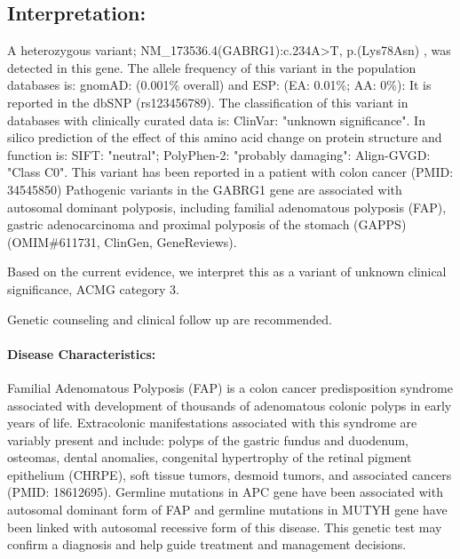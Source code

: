 \documentclass[9pt]{extarticle}
\begin{document}
\subsection*{Interpretation:}
\vspace{-1em}
A heterozygous variant; NM\_173536.4(GABRG1):c.234A>T, p.(Lys78Asn) , was detected in this gene. The allele frequency of this variant in the population databases is: gnomAD: (0.001\% overall) and ESP: (EA: 0.01\%; AA: 0\%): It is reported in the dbSNP (rs123456789). The classification of this variant in databases with clinically curated data is: ClinVar: "unknown significance". In silico prediction of the effect of this amino acid change on protein structure and function is: SIFT: "neutral"; PolyPhen-2: "probably damaging": Align-GVGD: "Class C0". This variant has been reported in a patient with colon cancer (PMID: 34545850) Pathogenic variants in the GABRG1 gene are associated with autosomal dominant polyposis, including familial adenomatous polyposis (FAP), gastric adenocarcinoma and proximal polyposis of the stomach (GAPPS) (OMIM\#611731, ClinGen, GeneReviews).

Based on the current evidence, we interpret this as a variant of unknown clinical significance, ACMG category 3.

Genetic counseling and clinical follow up are recommended.

\paragraph{Disease Characteristics:} Familial Adenomatous Polyposis (FAP) is a colon cancer predisposition syndrome associated with development of thousands of adenomatous colonic polyps in early years of life. Extracolonic manifestations associated with this syndrome are variably present and include: polyps of the gastric fundus and duodenum, osteomas, dental anomalies, congenital hypertrophy of the retinal pigment epithelium (CHRPE), soft tissue tumors, desmoid tumors, and associated cancers (PMID: 18612695). Germline mutations in APC gene have been associated with autosomal dominant form of FAP and germline mutations in MUTYH gene have been linked with autosomal recessive form of this disease. This genetic test may confirm a diagnosis and help guide treatment and management decisions.
\end{document}
